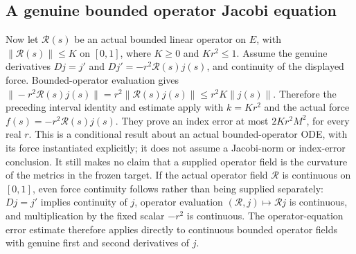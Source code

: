 \documentclass[11pt]{article}
\theoremstyle{definition}
\theoremstyle{remark}
\numberwithin{equation}{section}
\begin{document}
\subsection{A genuine bounded operator Jacobi equation}
\label{expanded:jacobi-operator-index-error}
Now let $\mathcal R(s)$ be an actual bounded linear operator on $E$, with
$\|\mathcal R(s)\|\le K$ on $[0,1]$, where $K\ge0$ and $Kr^2\le1$.
Assume the genuine derivatives $Dj=j'$ and
$Dj'=-r^2\mathcal R(s)j(s)$, and continuity of the displayed force.
Bounded-operator evaluation gives
$\|-r^2\mathcal R(s)j(s)\|
 =r^2\|\mathcal R(s)j(s)\|
 \le r^2K\|j(s)\|$.
Therefore the preceding interval identity and estimate apply with
$k=Kr^2$ and the actual force $f(s)=-r^2\mathcal R(s)j(s)$.
They prove an index error at most $2Kr^2M^2$, for every real $r$.
This is a conditional result about an actual bounded-operator ODE, with its
force instantiated explicitly; it does not assume a Jacobi-norm or index-error
conclusion. It still makes no claim that a supplied operator field is the
curvature of the metrics in the frozen target.
If the actual operator field $\mathcal R$ is continuous on $[0,1]$, even force
continuity follows rather than being supplied separately: $Dj=j'$ implies
continuity of $j$, operator evaluation $(\mathcal R,j)\mapsto\mathcal Rj$
is continuous, and multiplication by the fixed scalar $-r^2$ is continuous.
The operator-equation error estimate therefore applies directly to continuous
bounded operator fields with genuine first and second derivatives of $j$.

\clearpage
\end{document}
